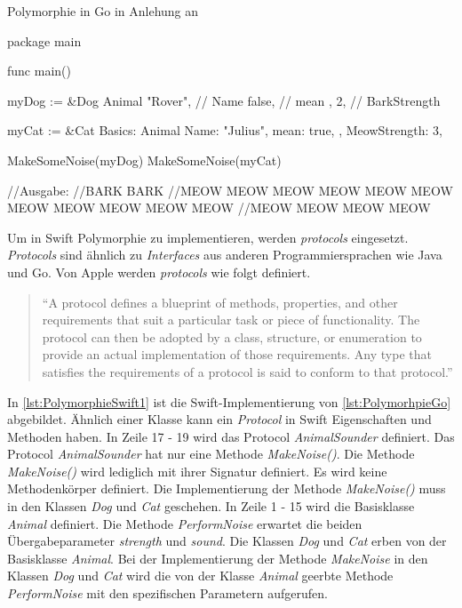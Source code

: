 \begin{listing}[H]
\caption{Polymorphie in Go in Anlehung an \cite[]{WilliamKennedy.2013}}
\label{lst:PolymorhpieGo2}
\begin{GoCode}
package main

func main() {
    myDog := &Dog{
        Animal{
            "Rover", // Name
            false,   // mean
        },
        2, // BarkStrength
    }

    myCat := &Cat{
        Basics: Animal{
            Name: "Julius",
            mean: true,
        },
        MeowStrength: 3,
    }

    MakeSomeNoise(myDog)
    MakeSomeNoise(myCat)
}
//Ausgabe:
//BARK BARK
//MEOW MEOW MEOW MEOW MEOW MEOW MEOW MEOW MEOW MEOW MEOW 
//MEOW MEOW MEOW MEOW
\end{GoCode}
\end{listing}

Um in Swift Polymorphie zu implementieren, werden \textit{protocols} eingesetzt.
\textit{Protocols} sind ähnlich zu \textit{Interfaces} aus anderen Programmiersprachen wie Java und Go.
Von Apple werden \textit{protocols} wie folgt definiert.

\begin{quote}
\enquote{A protocol defines a blueprint of methods, properties, and other requirements that suit a particular
task or piece of functionality. The protocol can then be adopted by a class, structure, or enumeration
to provide an actual implementation of those requirements. Any type that satisfies the requirements of
a protocol is said to conform to that protocol.} \cite[S.341]{Apple.2017}
\end{quote}

In \autoref{lst:PolymorphieSwift1} ist die Swift-Implementierung von \autoref{lst:PolymorhpieGo} abgebildet.
Ähnlich einer Klasse kann ein \textit{Protocol} in Swift Eigenschaften und Methoden haben. 
In Zeile 17 - 19 wird das Protocol \textit{AnimalSounder} definiert. 
Das Protocol \textit{AnimalSounder} hat nur eine Methode \textit{MakeNoise()}. 
Die Methode \textit{MakeNoise()} wird lediglich mit ihrer Signatur definiert. 
Es wird keine Methodenkörper definiert. 
Die Implementierung der Methode \textit{MakeNoise()} muss in den Klassen \textit{Dog} und \textit{Cat} geschehen.
In Zeile 1 - 15 wird die Basisklasse \textit{Animal} definiert. 
Die Methode \textit{PerformNoise} erwartet die beiden Übergabeparameter \textit{strength} und \textit{sound}.
Die Klassen \textit{Dog} und \textit{Cat} erben von der Basisklasse \textit{Animal}.
Bei der Implementierung der Methode \textit{MakeNoise} in den Klassen \textit{Dog} und \textit{Cat} wird die von der Klasse \textit{Animal} geerbte Methode \textit{PerformNoise} mit den spezifischen Parametern aufgerufen.

